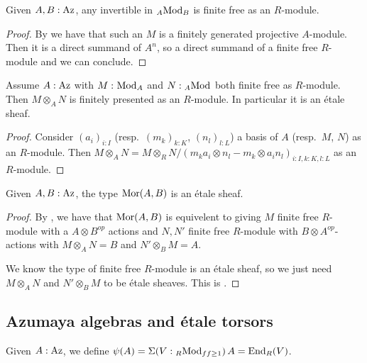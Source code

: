 \begin{lemma}\label{invertible-azumaya-finite-free}
Given $A,B:{\mathrm{Az}}$, any invertible in ${}_{A}{\mathrm{Mod}}_{B}$ is finite free as an $R$-module.
\end{lemma}

\begin{proof}
By  we have that such an $M$ is a finitely generated projective $A$-module. Then it is a direct summand of $A^n$, so a direct summand of a finite free $R$-module and we can conclude.
\end{proof}

\begin{lemma}\label{azumaya-tensor-finitely-presented}
Assume $A:{\mathrm{Az}}$ with $M:{}_{}{\mathrm{Mod}}_{A}$ and $N:{}_{A}{\mathrm{Mod}}_{}$ both finite free as $R$-module. Then $M\otimes_AN$ is finitely presented as an $R$-module. In particular it is an \'etale sheaf.
\end{lemma}

\begin{proof}
Consider $(a_i)_{i:I}$ (resp.\ $(m_k)_{k:K}$, $(n_l)_{l:L}$) a basis of $A$ (resp.\ $M$, $N$) as an $R$-module. Then $M\otimes_A N = M\otimes_RN / (m_ka_i\otimes n_l - m_k\otimes a_in_l)_{i:I,k:K,l:L}$ as an $R$-module.
\end{proof}

\begin{corollary}\label{morita-context-etale-sheaf}
Given $A,B:{\mathrm{Az}}$, the type ${\mathrm{Mor}}(A,B)$ is an \'etale sheaf.
\end{corollary}

\begin{proof}
By , we have that ${\mathrm{Mor}}(A,B)$ is equivelent to giving $M$ finite free $R$-module with a $A\otimes B^{op}$ actions and $N,N'$ finite free $R$-module with $B\otimes A^{op}$-actions with $M\otimes_AN = B$ and $N'\otimes_BM = A$.

We know the type of finite free $R$-module is an \'etale sheaf, so we just need $M\otimes_AN$ and $N'\otimes_BM$ to be \'etale sheaves. This is .
\end{proof}


\subsection{Azumaya algebras and \'etale torsors}

\begin{definition}
Given $A:{\mathrm{Az}}$, we define $\psi(A) = \Sigma(V:{}_{R}{\mathrm{Mod}}_{ff\geq 1})\, A={\mathrm{End}}_R(V)$.
\end{definition}

